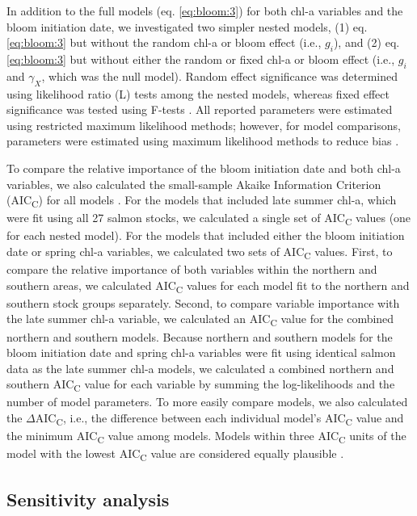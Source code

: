 In addition to the full models (eq. \ref{eq:bloom:3}) for both chl-a variables and the bloom
initiation date, we investigated two simpler nested models, (1) eq. \ref{eq:bloom:3} but
without the random chl-a or bloom effect (i.e., \(g_{i}\)), and (2) eq. \ref{eq:bloom:3} but
without either the random or fixed chl-a or bloom effect (i.e., \(g_{i}\) and
\(\gamma_{X}\), which was the null model).  Random effect significance was
determined using likelihood ratio (L) tests among the nested models, whereas
fixed effect significance was tested using F-tests \citep{Pinheiro2000a}. All
reported parameters were estimated using restricted maximum likelihood methods;
however, for model comparisons, parameters were estimated using maximum
likelihood methods to reduce bias \citep{Pinheiro2000a}.

To compare the relative importance of the bloom initiation date and both chl-a
variables, we also calculated the small-sample Akaike Information Criterion
(AIC\textsubscript{C}) for all models \citep{Hurvich1989a, Burnham2002a}. For
the models that included late summer chl-a, which were fit using all 27 salmon
stocks, we calculated a single set of AIC\textsubscript{C} values (one for each
nested model).  For the models that included either the bloom initiation date or
spring chl-a variables, we calculated two sets of AIC\textsubscript{C} values.
First, to compare the relative importance of both variables within the northern
and southern areas, we calculated AIC\textsubscript{C} values for each model fit
to the northern and southern stock groups separately.  Second, to compare
variable importance with the late summer chl-a variable, we calculated an
AIC\textsubscript{C} value for the combined northern and southern models.
Because northern and southern models for the bloom initiation date and spring
chl-a variables were fit using identical salmon data as the late summer chl-a
models, we calculated a combined northern and southern AIC\textsubscript{C}
value for each variable by summing the log-likelihoods and the number of model
parameters. To more easily compare models, we also calculated the
\(\Delta\)AIC\textsubscript{C}, i.e., the difference between each individual
model's AIC\textsubscript{C} value and the minimum AIC\textsubscript{C} value
among models. Models within three AIC\textsubscript{C} units of the model with
the lowest AIC\textsubscript{C} value are considered equally plausible
\citep{Burnham2002a}.


\subsection{Sensitivity analysis}

